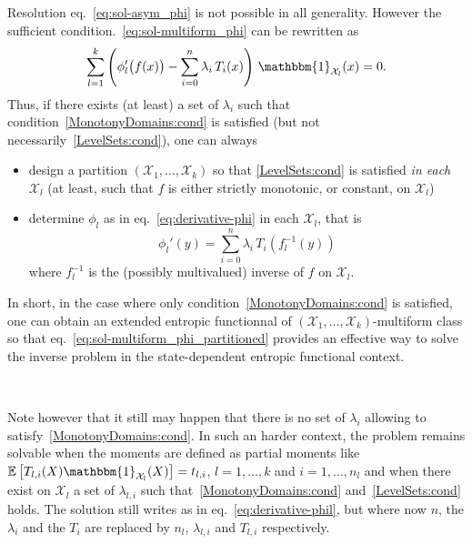 \documentclass[english,sort&compress]{elsarticle}
\theoremstyle{definition}
\theoremstyle{plain}
\theoremstyle{plain}
\def\X{\mathcal{X}}
\def\un{\mathbbm{1}}
\newcommand{\Esp}[1]{\mathbb{E}\left[ #1 \right]}
\begin{document}
Resolution  eq.~\eqref{eq:sol-asym_phi}  is  not  possible  in  all  generality.
However the sufficient  condition.~\eqref{eq:sol-multiform_phi} can be rewritten
as
%
\begin{equation}\label{eq:sol-multiform_phi_partitioned}
\sum_{l=1}^k \left( \phi_l'\big(f(x)\big) - \sum_{i=0}^n \lambda_i \, T_i(x)
\right) \, \un_{\X_l}(x) = 0.
\end{equation}
%
Thus,   if  there   exists  (at   least)  a   set  of   $\lambda_i$   such  that
condition~\ref{MonotonyDomains:cond}       is      satisfied       (but      not
necessarily~\ref{LevelSets:cond}), one can always
%
\begin{itemize}
\item design  a partition  $(\X_1,\ldots,\X_k)$ so that  \ref{LevelSets:cond} is
  satisfied {\em  in each $\X_l$}  (at least, such  that $f$ is  either strictly
  monotonic, or constant, on $\X_l$)
\item  determine $\phi_l$  as in  eq.~\eqref{eq:derivative-phi} in  each $\X_l$,
  that is
    \begin{equation}\label{eq:derivative-phil}
    \phi_l'(y) = \sum_{i=0}^n \lambda_i \, T_i\!\left(f_l^{-1}(y)\right)
    \end{equation}
    where $f_l^{-1}$ is the (possibly multivalued) inverse of $f$ on $\X_l$.
\end{itemize}

In      short,      in     the          case      where     only
condition~\ref{MonotonyDomains:cond}  is satisfied, one  can obtain  an extended
entropic   functionnal   of   $(\X_1,\ldots,\X_k)$-multiform   class   so   that
eq.~\eqref{eq:sol-multiform_phi_partitioned} provides an  effective way to solve
the inverse problem in the state-dependent entropic functional context.

\

Note  however that  it still  may happen  that there  is no  set  of $\lambda_i$
allowing to satisfy~\ref{MonotonyDomains:cond}.  In  such an harder context, the
problem remains solvable  when the moments are defined  as partial moments like
$\Esp{T_{l,i}(X) \un_{\X_l}(X)} =  t_{l,i}$, $l = 1 ,  \ldots , k$ and $i  = 1 ,
\ldots  , n_l$ and  when there  exist on  $\X_l$ a  set of  $\lambda_{l,i}$ such
that~\ref{MonotonyDomains:cond}  and~\ref{LevelSets:cond}  holds.  The  solution
still  writes  as in  eq.~\eqref{eq:derivative-phil},  but  where  now $n$,  the
$\lambda_i$ and the  $T_i$ are replaced by $n_l$,  $\lambda_{l,i}$ and $T_{l,i}$
respectively.
\end{document}
